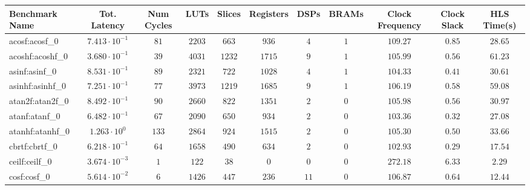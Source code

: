 \begin{tabular}{|l|c|c|c|c|c|c|c|c|c|c|}
\hline
Benchmark Name               & Tot. Latency            & Num Cycles & LUTs      & Slices    & Registers & DSPs    & BRAMs & Clock Frequency & Clock Slack & HLS Time(s) \\
\hline
acosf:acosf\_0               & $ 7.413 \cdot 10^{-1} $ & $ 81     $ & $ 2203  $ & $ 663   $ & $ 936   $ & $ 4   $ & $ 1 $ & $ 109.27      $ & $ 0.85    $ & $ 28.65   $ \\
acoshf:acoshf\_0             & $ 3.680 \cdot 10^{-1} $ & $ 39     $ & $ 4031  $ & $ 1232  $ & $ 1715  $ & $ 9   $ & $ 1 $ & $ 105.99      $ & $ 0.56    $ & $ 61.23   $ \\
asinf:asinf\_0               & $ 8.531 \cdot 10^{-1} $ & $ 89     $ & $ 2321  $ & $ 722   $ & $ 1028  $ & $ 4   $ & $ 1 $ & $ 104.33      $ & $ 0.41    $ & $ 30.61   $ \\
asinhf:asinhf\_0             & $ 7.251 \cdot 10^{-1} $ & $ 77     $ & $ 3973  $ & $ 1219  $ & $ 1685  $ & $ 9   $ & $ 1 $ & $ 106.19      $ & $ 0.58    $ & $ 59.08   $ \\
atan2f:atan2f\_0             & $ 8.492 \cdot 10^{-1} $ & $ 90     $ & $ 2660  $ & $ 822   $ & $ 1351  $ & $ 2   $ & $ 0 $ & $ 105.98      $ & $ 0.56    $ & $ 30.97   $ \\
atanf:atanf\_0               & $ 6.482 \cdot 10^{-1} $ & $ 67     $ & $ 2090  $ & $ 650   $ & $ 934   $ & $ 2   $ & $ 0 $ & $ 103.36      $ & $ 0.32    $ & $ 27.08   $ \\
atanhf:atanhf\_0             & $ 1.263 \cdot 10^{0}  $ & $ 133    $ & $ 2864  $ & $ 924   $ & $ 1515  $ & $ 2   $ & $ 0 $ & $ 105.30      $ & $ 0.50    $ & $ 33.66   $ \\
cbrtf:cbrtf\_0               & $ 6.218 \cdot 10^{-1} $ & $ 64     $ & $ 1658  $ & $ 490   $ & $ 634   $ & $ 2   $ & $ 0 $ & $ 102.93      $ & $ 0.29    $ & $ 17.54   $ \\
ceilf:ceilf\_0               & $ 3.674 \cdot 10^{-3} $ & $ 1      $ & $ 122   $ & $ 38    $ & $ 0     $ & $ 0   $ & $ 0 $ & $ 272.18      $ & $ 6.33    $ & $ 2.29    $ \\
cosf:cosf\_0                 & $ 5.614 \cdot 10^{-2} $ & $ 6      $ & $ 1426  $ & $ 447   $ & $ 236   $ & $ 11  $ & $ 0 $ & $ 106.87      $ & $ 0.64    $ & $ 12.44   $ \\

\end{tabular}
